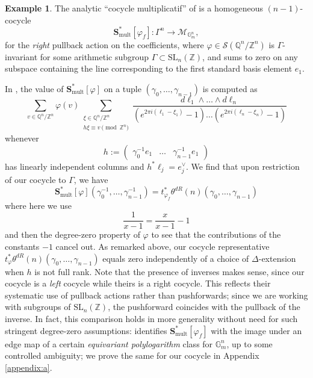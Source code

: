 \documentclass[10pt]{amsart}
\theoremstyle{definition}
\newtheorem{ex}[thm]{Example}
\newcommand{\Z}{\mathbb{Z}}
\newcommand{\Q}{\mathbb{Q}}
\newcommand{\cS}{\mathcal{S}}
\newcommand{\G}{\mathbb{G}}
\newcommand{\SL}{\mathrm{SL}}
\numberwithin{equation}{section}
\begin{document}
    \begin{ex} \label{ex:bcg}
        The analytic ``cocycle multiplicatif'' of \cite{BCGV} is a homogeneous $(n-1)$-cocycle 
        \[
        \mathbf{S}_{\mathrm{mult}}^*[\varphi_f]:\Gamma^n\to \mathcal{M}_{\G_m^n},
        \]
        for the \emph{right} pullback action on the coefficients, where $\varphi\in \cS(\Q^n/\Z^n)$ is $\Gamma$-invariant for some arithmetic subgroup $\Gamma\subset \SL_n(\Z)$, and sums to zero on any subspace containing the line corresponding to the first standard basis element $e_1$. 
        
        In \cite[Proposition 8.8]{BCGV}, the value of $\mathbf{S}_{\mathrm{mult}}^*[\varphi]$ on a tuple $(\gamma_0,\ldots, \gamma_{n-1})$ is computed as
        \[
            \sum_{v\in \Q^n/\Z^n}\varphi(v)\sum_{\substack{\xi\in \Q^n/\Z^n\\ h \xi \equiv v \pmod{\Z^n}}} 
            \frac{d\ell_1\wedge \ldots \wedge d\ell_n}{(e^{2\pi i (\ell_1-\xi_1)}-1)\ldots (e^{2\pi i (\ell_n-\xi_n)}-1)}
        \]
        whenever 
        \[
        h:=\begin{pmatrix} \gamma_0^{-1}e_1 & \ldots & \gamma_{n-1}^{-1}e_1\end{pmatrix}
        \]
        has linearly independent columns and $h^* \ell_j = e_j^\vee$. We find that upon restriction of our cocycle to $\Gamma$, we have
        \begin{equation} \label{eq:bcgcomp}
            \mathbf{S}_{\mathrm{mult}}^*[\varphi](\gamma_0^{-1},\ldots, \gamma_{n-1}^{-1})= t_{\varphi_f}^* \theta^{dR}(n)(\gamma_0,\ldots, \gamma_{n-1})
        \end{equation}
        where here we use 
        \[
        \frac{1}{x-1}= \frac{x}{x-1} -1
        \]
        and then the degree-zero property of $\varphi$ to see that the contributions of the constants $-1$ cancel out. As remarked above, our cocycle representative $t_{\varphi}^* \theta^{dR}(n)(\gamma_0,\ldots, \gamma_{n-1})$ equals zero independently of a choice of $\Delta$-extension when $h$ is not full rank. Note that the presence of inverses makes sense, since our cocycle is a \emph{left} cocycle while theirs is a right cocycle. This reflects their systematic use of pullback actions rather than pushforwards; since we are working with subgroups of $\SL_n(\Z)$, the pushforward coincides with the pullback of the inverse. In fact, this comparison holds in more generality without need for such stringent degree-zero assumptions: \cite[Theorem 1.7]{BCGV} identifies $\mathbf{S}_{\mathrm{mult}}^*[\varphi_f]$ with the image under an edge map of a certain \emph{equivariant polylogarithm} class for $\G_m^n$, up to some controlled ambiguity; we prove the same for our cocycle in Appendix \ref{appendix:a}. 
    \end{ex}
\end{document}
